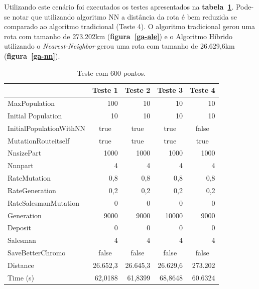 \documentclass{abnt}
\begin{document}
	
		Utilizando este cenário foi executados os testes apresentados na \textbf{tabela~\ref{tst-01}}. Pode-se notar que utilizando algoritmo NN a distância da rota é bem reduzida se comparado ao algoritmo tradicional (Teste 4).  O algoritmo tradicional gerou uma rota com tamanho de 273.202km (\textbf{figura~\ref{ga-ale}}) e o Algoritmo Híbrido utilizando o \textit{Nearest-Neighbor} gerou uma rota com tamanho de 26.629,6km (\textbf{figura~\ref{ga-nn}}). 
		
		\begin{table}[htbp]
			\centering
			\begin{tabular}{|l|r|r|r|r|}
				
				\hline
				&Teste 1 &Teste 2 &Teste 3 &Teste 4 \\
				\hline
				MaxPopulation & 100 & 10 & 10 & 10\\ \hline
				Initial Population & 10 & 10 & 10 & 10\\ \hline
				InitialPopulationWithNN & \multicolumn{1}{c|}{true} & \multicolumn{1}{c|}{true} & \multicolumn{1}{c|}{true} & \multicolumn{1}{c|}{false} \\ \hline
				MutationRouteitself & \multicolumn{1}{c|}{true} & \multicolumn{1}{c|}{true} & \multicolumn{1}{c|}{true} & \multicolumn{1}{c|}{true}\\ \hline
				NnsizePart & 1000 & 1000 & 1000 & 1000 \\ \hline
				Nnnpart & 4 & 4 & 4 & 4 \\ \hline
				RateMutation & 0,8 & 0,8 & 0,8 & 0,8 \\ \hline
				RateGeneration & 0,2 & 0,2 & 0,2 & 0,2 \\ \hline
				RateSalesmanMutation & 0 & 0 & 0 & 0 \\ \hline
				Generation & 9000 & 9000 & 10000 & 9000\\ \hline
				Deposit & 0 & 0 & 0 & 0 \\ \hline
				Salesman & 4 & 4 & 4 & 4 \\ \hline
				SaveBetterChromo & \multicolumn{1}{c|}{false} & \multicolumn{1}{c|}{false} & \multicolumn{1}{c|}{false} & \multicolumn{1}{c|}{false} \\ \hline
				Distance & 26.652,3 & 26.645,3 & 26.629,6 & 273.202 \\ \hline
				Time (s) & 62,0188 & 61,8399 & 68,8648  & 60.6324\\ \hline
			\end{tabular}
			\caption{Teste com 600 pontos.}
			\label{tst-01}
			\end{table}
\end{document}
